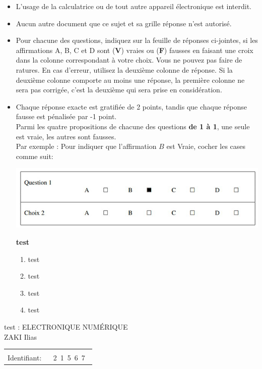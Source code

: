 \documentclass{book}%
\begin{document}
\begin{itemize}%
\item%
L'usage de la calculatrice ou de tout autre appareil électronique est interdit.%
\item%
Aucun autre document que ce sujet et sa grille réponse n'est autorisé.%
\item%
Pour chacune des questions, indiquez sur la feuille de réponses ci-jointes, si les affirmations A, B, C et D sont (\textbf{V}) vraies ou (\textbf{F}) fausses en faisant une croix dans la colonne correspondant à votre choix. Vous ne pouvez pas faire de ratures. En cas d'erreur, utilisez la deuxième colonne de réponse. Si la deuxième colonne comporte au moins une réponse, la première colonne ne sera pas corrigée, c'est la deuxième qui sera prise en considération.%
\item%
Chaque réponse exacte est gratifiée de 2 points, tandis que chaque réponse fausse est pénalisée par -1 point. \\ 	Parmi les quatre propositions de chacune des questions \textbf{de 1 à 1}, une seule est vraie, les autres sont fausses. \\ 	Par exemple : Pour indiquer que l'affirmation $B$ est Vraie, cocher les cases comme suit:  \\ \begin{center}	\includegraphics[scale=0.8]{reponses.png} \end{center}%
\thispagestyle{empty}%
\begin{exercise}%
\textbf{test }%
\begin{enumerate}[label=\textbf{\Alph*. }]%
\item%
test%
\item%
test%
\item%
test%
\item%
test%
\end{enumerate}%
\end{exercise}%
\end{itemize}%
\newpage%
\thispagestyle{empty}%
test : ELECTRONIQUE NUMÉRIQUE $\qquad \qquad \qquad \qquad \qquad \qquad \qquad \qquad$ ZAKI Ilias %
\begin{flushright}%
\begin{tabular}{|l|}%
\hline%
 \\%
\thispagestyle{empty}%
Identifiant: $\quad$ {\Large 2~1~5~6~7~}%
 \\%
\hline%
\end{tabular}%
\end{flushright}%
\end{document}
